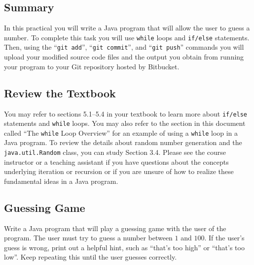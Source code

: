 



\subsection*{Summary}
\vspace*{-.05in}

In this practical you will write a Java program that will allow the user to guess a number. To complete this task you
will use {\tt while} loops and {\tt if/else} statements.  Then, using the ``{\tt git add}'', ``{\tt git  commit}'', and
``{\tt git push}'' commands you will upload your modified source code files and the output you obtain from running your
program to your Git repository hosted by Bitbucket.

\vspace*{-.1in}
\subsection*{Review the Textbook}
\vspace*{-.05in}

You may refer to sections 5.1--5.4 in your textbook to learn more about {\tt if/else} statements and {\tt while} loops.
You may also refer to the section in this document called ``The {\tt while} Loop Overview'' for an example of using a
{\tt while} loop in a Java program. To review the details about random number generation and the {\tt java.util.Random}
class, you can study Section 3.4. Please see the course instructor or a teaching assistant if you have questions about
the concepts underlying iteration or recursion or if you are unsure of how to realize these fundamental ideas in a Java
program.

\vspace*{-.1in}
\subsection*{Guessing Game}
\vspace*{-.05in}

Write a Java program that will play a guessing game with the user of the program.  The user must try to guess a number
between $1$ and $100$. If the user's guess is wrong, print out a helpful hint, such as ``that's too high'' or ``that's
too low''. Keep repeating this until the user guesses correctly.

